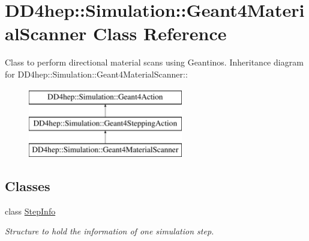 \hypertarget{class_d_d4hep_1_1_simulation_1_1_geant4_material_scanner}{
\section{DD4hep::Simulation::Geant4MaterialScanner Class Reference}
\label{class_d_d4hep_1_1_simulation_1_1_geant4_material_scanner}
}


Class to perform directional material scans using Geantinos.  
Inheritance diagram for DD4hep::Simulation::Geant4MaterialScanner::\begin{figure}[H]
\begin{center}
\leavevmode
\includegraphics[height=3cm]{class_d_d4hep_1_1_simulation_1_1_geant4_material_scanner}
\end{center}
\end{figure}
\subsection*{Classes}
\begin{DoxyCompactItemize}
\item 
class \hyperlink{class_d_d4hep_1_1_simulation_1_1_geant4_material_scanner_1_1_step_info}{StepInfo}
\begin{DoxyCompactList}\small\item\em Structure to hold the information of one simulation step. \item\end{DoxyCompactList}\end{DoxyCompactItemize}
